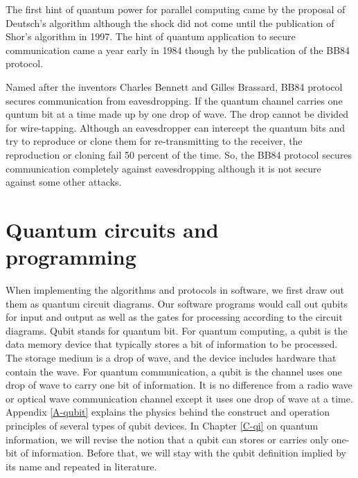 \documentclass{book}
\begin{document}
The first hint of quantum power for parallel computing came by the proposal of Deutsch's algorithm\cite{1985Deutsch} although the shock did not come until the publication of Shor's algorithm in 1997. The hint of quantum application to secure communication came a year early in 1984 though by the publication of the BB84 protocol\cite{BB84}.

Named after the inventors Charles Bennett and Gilles Brassard, BB84 protocol secures communication from eavesdropping. If the quantum channel carries one quntum bit at a time made up by one drop of wave. The drop cannot be divided for wire-tapping. Although an eavesdropper can intercept the quantum bits and try to reproduce or clone them for re-transmitting to the receiver, the reproduction or cloning fail 50 percent of the time. So, the BB84 protocol secures communication completely against eavesdropping although it is not secure against some other attacks.

\section{Quantum circuits and programming}
When implementing the algorithms and protocols in software, we first draw out them as quantum circuit diagrams. Our software programs would call out qubits for input and output as well as the gates for processing according to the circuit diagrams. Qubit stands for quantum bit. For quantum computing, a qubit is the data memory device that typically stores a bit of information to be processed. The storage medium is a drop of wave, and the device includes hardware that contain the wave. For quantum communication, a qubit is the channel uses one drop of wave to carry one bit of information. It is no difference from a radio wave or optical wave communication channel except it uses one drop of wave at a time. Appendix \ref{A-qubit} explains the physics behind the construct and operation principles of several types of qubit devices. In Chapter \ref{C-qi} on quantum information, we will revise the notion that a qubit can stores or carries only one-bit of information. Before that, we will stay with the qubit definition implied by its name and repeated in literature.
\end{document}
